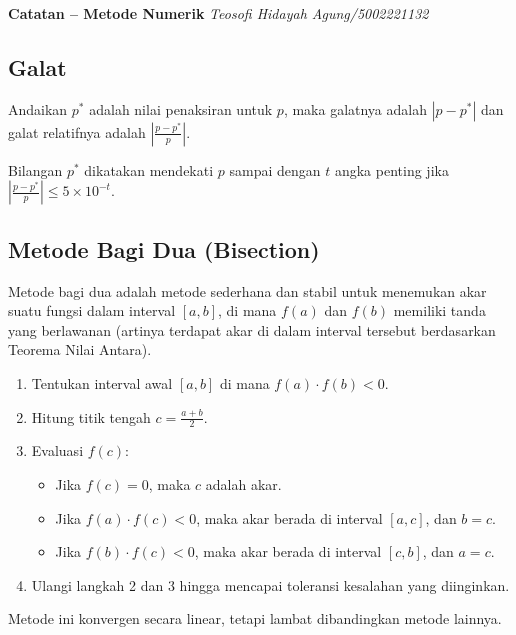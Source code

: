 \documentclass[a4paper,extrafontsizes, 9pt]{memoir}
\begin{document}
\tiny {\normalsize \textbf{{Catatan -- Metode Numerik}} \hfill \textit{Teosofi Hidayah Agung/5002221132}}
	\begin{multicols}{3}
        \section*{\small Galat}
        Andaikan $p^*$ adalah nilai penaksiran untuk $p$, maka galatnya adalah $|p - p^*|$ dan galat relatifnya adalah $\left|\frac{p - p^*}{p}\right|$.

        Bilangan $p^*$ dikatakan mendekati $p$ sampai dengan $t$ angka penting jika $\left|\frac{p - p^*}{p}\right| \leq 5 \times 10^{-t}$.
        \subsection*{\small Metode Bagi Dua (Bisection)}
          Metode bagi dua adalah metode sederhana dan stabil untuk menemukan akar suatu fungsi dalam interval \([a, b]\), di mana \(f(a)\) dan \(f(b)\) memiliki tanda yang berlawanan (artinya terdapat akar di dalam interval tersebut berdasarkan Teorema Nilai Antara).
          \begin{enumerate}
              \item Tentukan interval awal \([a, b]\) di mana \(f(a) \cdot f(b) < 0\).
              \item Hitung titik tengah \(c = \frac{a + b}{2}\).
              \item Evaluasi \(f(c)\):
              \begin{itemize}
            \item Jika \(f(c) = 0\), maka \(c\) adalah akar.
            \item Jika \(f(a) \cdot f(c) < 0\), maka akar berada di interval \([a, c]\), dan \(b = c\).
            \item Jika \(f(b) \cdot f(c) < 0\), maka akar berada di interval \([c, b]\), dan \(a = c\).
              \end{itemize}
              \item Ulangi langkah 2 dan 3 hingga mencapai toleransi kesalahan yang diinginkan.
          \end{enumerate}
          Metode ini konvergen secara linear, tetapi lambat dibandingkan metode lainnya. 


\end{multicols}
\end{document}
